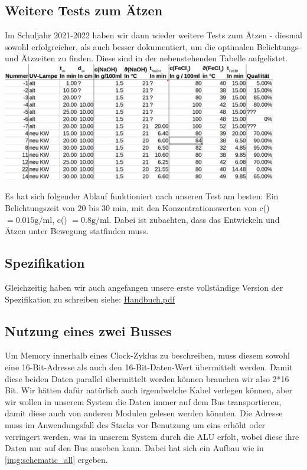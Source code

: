 \documentclass{scrartcl}
\begin{document}
    \newpage
    \subsection{Weitere Tests zum Ätzen}
    \vspace{-15pt}
    Im Schuljahr 2021-2022 haben wir dann wieder weitere Tests zum Ätzen - diesmal sowohl erfolgreicher, als auch besser dokumentiert, um die optimalen Belichtungs- und Ätzzeiten zu finden.
    Diese sind in der nebenstehenden Tabelle aufgelistet.
    \newline
    \vspace{-5pt}
    \includegraphics[width=0.9\textwidth]{aetzen_tabelle}

    Es hat sich folgender Ablauf funktioniert nach unseren Test am besten: Ein Belichtungszeit von $20$ bis $30$ min, mit den Konzentrationswerten von
    c() $= 0.015 \text{g/ml}$, c() $= 0.8 \text{g/ml}$. Dabei ist zubachten, dass das Entwickeln und Ätzen unter Bewegung statfinden muss.

    \subsection{Spezifikation}
    \vspace{-15pt}
    Gleichzeitig haben wir auch angefangen unsere erste vollständige Version der Spezifikation zu schreiben siehe: \href{https://www.mediafire.com/file/9iz9wlpiuwhr1ln/HandBuch.pdf/file}{Handbuch.pdf}

    \newpage
    \subsection{Nutzung eines zwei Busses}
    \vspace{-15pt}
    Um Memory innerhalb eines Clock-Zyklus zu beschreiben, muss diesem sowohl eine 16-Bit-Adresse als auch den 16-Bit-Daten-Wert übermittelt werden.
    Damit diese beiden Daten parallel übermittelt werden können brauchen wir also 2*16 Bit.
    Wir hätten dafür natürlich auch irgendwelche Kabel verlegen können, aber wir wollen in unserem System die Daten immer auf dem Bus transportieren, damit diese auch von anderen Modulen gelesen werden könnten.
    Die Adresse muss im Anwendungsfall des Stacks vor Benutzung um eins erhöht oder verringert werden, was in unserem System durch die ALU erfolt, wobei diese ihre Daten nur auf den Bus auseben kann.
    Dabei hat sich ein Aufbau wie in \autoref{img:schematic_all} ergeben.
\end{document}
